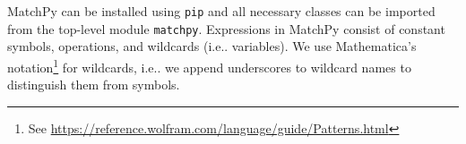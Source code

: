 \documentclass[conference,compsoc]{IEEEtran}
\makeatletter
\DeclareRobustCommand\onedot{\futurelet\@let@token\@onedot}
\def\@onedot{\ifx\@let@token.\else.\null\fi\xspace}
\def\ie{{i.e}\onedot} \def\Ie{{I.e}\onedot}
\newif\ifminted
\makeatother
\begin{document}
MatchPy can be installed using \texttt{pip} and all necessary classes can be imported from the top-level module \texttt{matchpy}.
Expressions in MatchPy consist of constant symbols, operations, and wildcards (\ie variables).
We use Mathematica's notation\footnote{See \url{https://reference.wolfram.com/language/guide/Patterns.html}} for wildcards, \ie we append underscores to wildcard names to distinguish them from symbols.

\ifminted
MatchPy can be used with native Python types such as \texttt{list} and \texttt{int}.
The following is an example of how the subject \texttt{[0, 1]} can be matched against the pattern \texttt{[x\_, 1]}.
The expected match here is the replacement \texttt{0} for \texttt{x\_}.
Because some patterns can have multiple distinct matches, \texttt{match} is a generator that yields any match found.
Hence, we use \texttt{next} because we only want to use the first (and in this case only) match of the pattern:
\begin{verbatim}
>>> x_ = Wildcard.dot('x')
>>> next(match([0, 1], Pattern([x_, 1])))
{'x': 0}
\end{verbatim}
\fi
\end{document}
